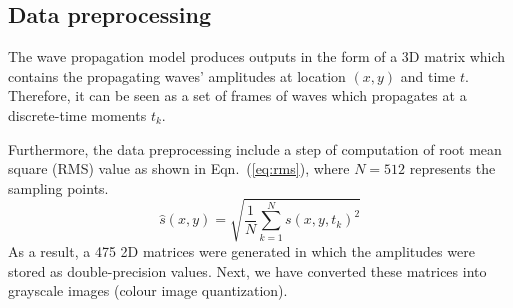 \subsection{Data preprocessing}
The wave propagation model produces outputs in the form of a 3D matrix which contains the propagating waves' amplitudes at location \((x, y)\) and time \(t\). 
Therefore, it can be seen as a set of frames of waves which propagates at a discrete-time moments \(t_k\).

Furthermore, the data preprocessing include a step of computation of root mean square (RMS) value as shown in Eqn.~(\ref{eq:rms}), where \(N=512\) represents the sampling points.
\begin{equation}
	\hat{s}(x,y) = \sqrt{\frac{1}{N}\sum_{k=1}^{N} s(x,y,t_k)^2}
	\label{eq:rms}
\end{equation}
As a result, a 475 2D matrices were generated in which the amplitudes were stored as double-precision values.
Next, we have converted these matrices into grayscale images (colour image quantization).

